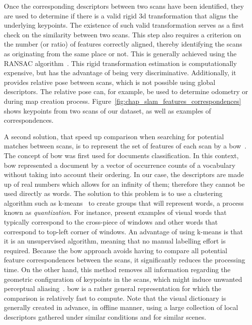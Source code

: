 Once the corresponding descriptors between two scans have been identified, they are used to determine if there is a valid rigid \gls*{3d} transformation that aligns the underlying keypoints. The existence of such valid transformation serves as a first check on the similarity between two scans. This step also requires a criterion on the number (or ratio) of features correctly aligned, thereby identifying the scans as originating from the same place or not. This is generally achieved using the RANSAC algorithm~\citep{Fischler1981}. This rigid transformation estimation is computationally expensive, but has the advantage of being very discriminative. Additionally, it provides relative pose between scans, which is not possible using global descriptors. The relative pose can, for example, be used to determine odometry or during map creation process. Figure~\ref{fig:chap_slam_features_correspondences} shows keypoints from two scans of our dataset, as well as examples of correspondences.

A second solution, that speed up comparison when searching for potential matches between scans, is to represent the set of features of each scan by a \gls*{bow}~\citep{salton1983mcgill}. The concept of \gls*{bow} was first used for documents classification. In this context, \gls*{bow} represented a document by a vector of occurrence counts of a vocabulary without taking into account their ordering. In our case, the descriptors are made up of real numbers which allows for an infinity of them; therefore they cannot be used directly as words. The solution to this problem is to use a clustering algorithm such as k-means~\citep{MacQueen1967} to create groups that will represent words, a process known as \emph{quantization}. For instance, \citet{Cummins2008} present examples of visual words that typically correspond to the cross-piece of windows and other words that correspond to top-left corner of windows. An advantage of using k-means is that it is an unsupervised algorithm, meaning that no manual labelling effort is required. Because the \gls*{bow} approach avoids having to compare all potential feature correspondences between the scans, it significantly reduces the processing time. On the other hand, this method removes all information regarding the geometric configuration of keypoints in the scans, which might induce unwanted perceptual aliasing~\citep{Mariottini2011}. \gls*{bow} is a rather general representation for which the comparison is relatively fast to compute. Note that the visual dictionary is generally created in advance, in offline manner, using a large collection of local descriptors gathered under similar conditions and for similar scenes.

